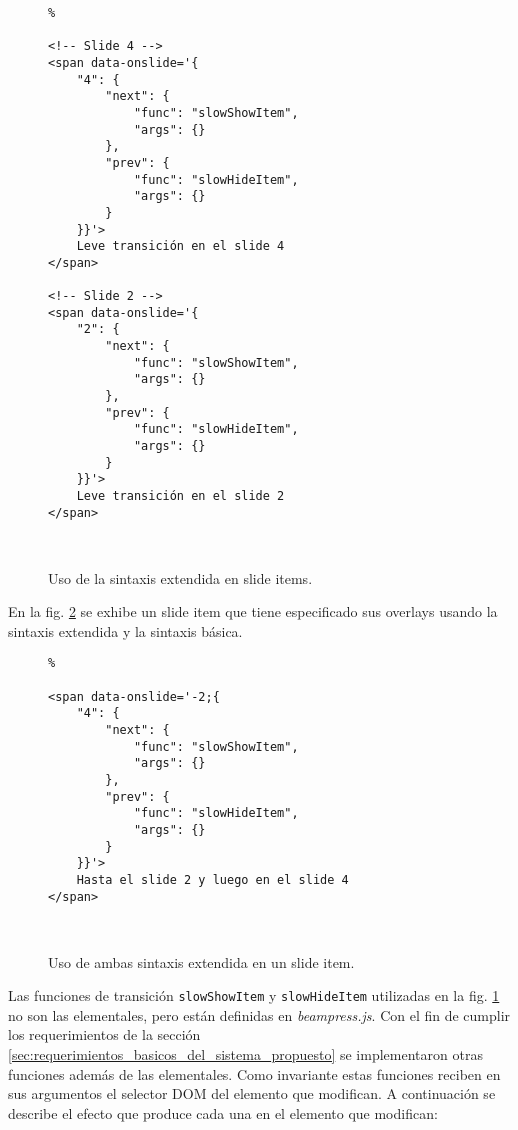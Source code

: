 			\begin{figure}[htb]%
				\begin{lstlisting}%

<!-- Slide 4 -->
<span data-onslide='{
    "4": {
        "next": {
            "func": "slowShowItem",
            "args": {}
        },
        "prev": {
            "func": "slowHideItem",
            "args": {}
        }
    }}'>
	Leve transición en el slide 4
</span>

<!-- Slide 2 -->
<span data-onslide='{
    "2": {
        "next": {
            "func": "slowShowItem",
            "args": {}
        },
        "prev": {
            "func": "slowHideItem",
            "args": {}
        }
    }}'>
	Leve transición en el slide 2
</span>

			
				\end{lstlisting}
				\caption{Uso de la sintaxis extendida en slide items.} 
				\label{fig:extended_syntax_html}
			\end{figure}

			En la fig. \ref{fig:basic_and_extended_syntax_html} se exhibe un slide item que tiene especificado sus overlays usando la sintaxis extendida y la sintaxis básica.


			\begin{figure}[htb]%
				\begin{lstlisting}%

<span data-onslide='-2;{
    "4": {
        "next": {
            "func": "slowShowItem",
            "args": {}
        },
        "prev": {
            "func": "slowHideItem",
            "args": {}
        }
    }}'>
	Hasta el slide 2 y luego en el slide 4
</span>

			
				\end{lstlisting}
				\caption{Uso de ambas sintaxis extendida en un slide item.} 
				\label{fig:basic_and_extended_syntax_html}
			\end{figure}			


			Las funciones de transición \texttt{slowShowItem} y \texttt{slowHideItem} utilizadas en la fig. \ref{fig:extended_syntax_html} no son las elementales, pero están definidas en \textit{beampress.js}. Con el fin de cumplir los requerimientos de la sección \ref{sec:requerimientos_basicos_del_sistema_propuesto} se implementaron otras funciones además de las elementales. Como invariante estas funciones reciben en sus argumentos el selector DOM del elemento que modifican. A continuación se describe el efecto que produce cada una en el elemento que modifican:

